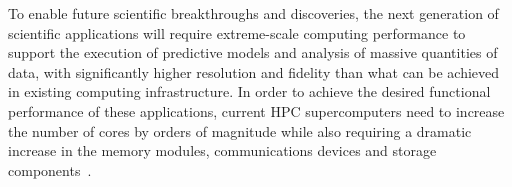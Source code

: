 To enable future scientific breakthroughs and discoveries, the next generation of 
scientific applications will require extreme-scale computing performance to support the 
execution of predictive models and analysis of massive quantities of data, with 
significantly higher resolution and fidelity than what %
can be achieved in existing 
computing infrastructure. In order to achieve the desired functional performance of 
these applications, 
current HPC supercomputers need to increase the number of cores by orders of magnitude while also requiring a dramatic increase in the %
memory modules, communications devices and storage components~\cite{doe_ascr_exascale_2011}.



